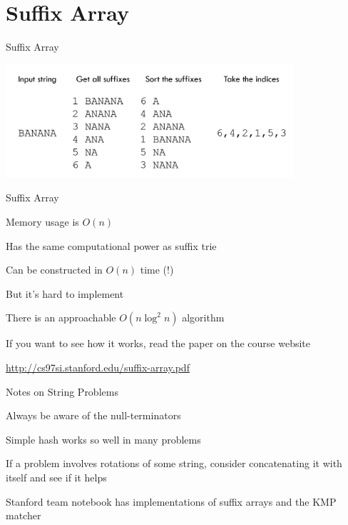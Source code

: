 \documentclass[13pt,onlymath]{beamer}
\begin{document}
\section{Suffix Array}

\begin{frame}{Suffix Array}
\begin{center}
\includegraphics[width=0.8\textwidth]{figures/sufarray}
\end{center}
\end{frame}

\begin{frame}{Suffix Array}
\BIT
\item Memory usage is $O(n)$
\item Has the same computational power as suffix trie
\item Can be constructed in $O(n)$ time (!)
\BIT
\item But it's hard to implement
\EIT
\item There is an approachable $O(n \log^2 n)$ algorithm
\BIT
\item If you want to see how it works, read the paper on the course website
\item \url{http://cs97si.stanford.edu/suffix-array.pdf}
\EIT\EIT
\end{frame}


\begin{frame}{Notes on String Problems}
\BIT
\item Always be aware of the null-terminators
\item Simple hash works so well in many problems
\item If a problem involves rotations of some string, consider concatenating it with itself and see if it helps
\item Stanford team notebook has implementations of suffix arrays and the KMP matcher
\EIT
\end{frame}
\end{document}
